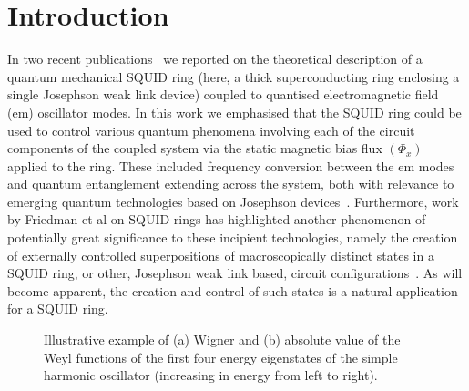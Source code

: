 \documentclass[twocolumn,a4paper,superscriptaddress,showpacs,floatfix,pra]{revtex4}
\begin{document}
\section*{Introduction}

In  two recent  publications~\cite{EverittSCVRPP01,EverittCSPPVR01} we
reported on the theoretical  description of a quantum mechanical SQUID
ring (here, a thick  superconducting ring enclosing a single Josephson
weak  link device)  coupled  to quantised  electromagnetic field  (em)
oscillator modes. In this work we emphasised that the SQUID ring could
be used  to control  various quantum phenomena  involving each  of the
circuit components of the coupled  system via the static magnetic bias
flux $\left(  \Phi _{x}\right) $  applied to the ring.  These included
frequency  conversion between  the em  modes and  quantum entanglement
extending across  the system, both with relevance  to emerging quantum
technologies              based              on              Josephson
devices~\cite{Chiorescu2003,Martinis2002,RouseHL95,SilvestriniRGE00,NakamuraCT97,NakamuraPT99,vanderWalWSHOLM00,lo_hk_1998,OrlandoMTvLLM99,MakhlinSS99,AverinNO90}. Furthermore,
work  by  Friedman  et  al  on SQUID  rings  has  highlighted  another
phenomenon  of  potentially  great  significance  to  these  incipient
technologies,   namely   the   creation   of   externally   controlled
superpositions of macroscopically distinct  states in a SQUID ring, or
other,       Josephson       weak       link      based,       circuit
configurations~\cite{FriedmanPCTL00}.  As  will  become apparent,  the
creation and  control of  such states is  a natural application  for a
SQUID ring.
\begin{figure}[!t]
\begin{center}
\end{center}
\caption{Illustrative example of (a)  Wigner and (b) absolute value of
the Weyl functions of the  first four energy eigenstates of the simple
harmonic oscillator (increasing in energy from left to right). }
\label{SHO}
\end{figure}
\end{document}
